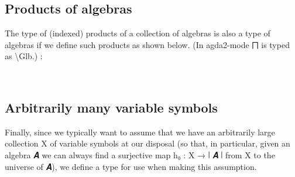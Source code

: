 \documentclass[a4paper,UKenglish,cleveref, autoref, thm-restate]{lipics-v2019}
\begin{document}
\subsection{Products of algebras}
The type of (indexed) products of a collection of algebras is also a type of algebras if we define such products as shown below. (In agda2-mode ⨅ is typed as \textbackslash Glb.)
:
\begin{code}%
%
\>[1]\AgdaSpace{}%
\AgdaSymbol{:}\AgdaSpace{}%
\AgdaSymbol{\{}\AgdaSpace{}%
\AgdaSymbol{:}\AgdaSpace{}%
\AgdaSpace{}%
\AgdaSpace{}%
\AgdaSymbol{\}(}\AgdaSpace{}%
\AgdaSymbol{:}\AgdaSpace{}%
\AgdaSpace{}%
\AgdaSpace{}%
\AgdaSpace{}%
\AgdaSpace{}%
\AgdaSpace{}%
\AgdaSymbol{)}\AgdaSpace{}%
\AgdaSpace{}%
\AgdaSpace{}%
\AgdaSymbol{(}\AgdaSpace{}%
\AgdaSpace{}%
\AgdaSymbol{)}\AgdaSpace{}%
\<%
\\
%
\>[1]\AgdaSpace{}%
\AgdaSpace{}%
\AgdaSymbol{=}%
\>[8]\AgdaSymbol{((}\AgdaSpace{}%
\AgdaSymbol{:}\AgdaSpace{}%
\AgdaSymbol{\AgdaUnderscore{})}\AgdaSpace{}%
\AgdaSpace{}%
\AgdaSpace{}%
\AgdaSpace{}%
\AgdaSpace{}%
\AgdaSymbol{)}\AgdaSpace{}%
\AgdaOperator{\AgdaInductiveConstructor{,}}%
\>[31]\AgdaSpace{}%
\AgdaSpace{}%
\AgdaSpace{}%
\AgdaSpace{}%
\AgdaSpace{}%
\AgdaSymbol{(}\AgdaSpace{}%
\AgdaSpace{}%
\AgdaSpace{}%
\AgdaSymbol{)}\AgdaSpace{}%
\AgdaSpace{}%
\AgdaSpace{}%
\AgdaSpace{}%
\AgdaSpace{}%
\AgdaSpace{}%
\<%
\end{code}

\subsection{Arbitrarily many variable symbols}

Finally, since we typically want to assume that we have an arbitrarily large collection X of variable symbols at our disposal (so that, in particular, given an algebra 𝑨 we can always find a surjective map h₀ : X → ∣ 𝑨 ∣ from X to the universe of 𝑨), we define a type for use when making this assumption.
\end{document}
